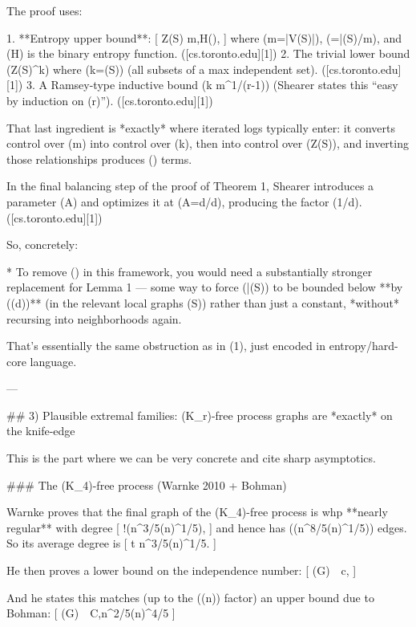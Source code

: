 The proof uses:

1. **Entropy upper bound**:
   [
   \log Z(S) \le m,H(\phi),
   ]
   where (m=|V(S)|), (\phi=\bar\alpha(S)/m), and (H) is the binary entropy function. ([cs.toronto.edu][1])
2. The trivial lower bound (Z(S)^{k}) where (k=\alpha(S)) (all subsets of a max independent set). ([cs.toronto.edu][1])
3. A Ramsey-type inductive bound (k \ge m^{1/(r-1)}) (Shearer states this “easy by induction on (r)”). ([cs.toronto.edu][1])

That last ingredient is *exactly* where iterated logs typically enter: it converts control over (m) into control over (k), then into control over (\log Z(S)), and inverting those relationships produces (\log\log) terms.

In the final balancing step of the proof of Theorem 1, Shearer introduces a parameter (A) and optimizes it at (A=d/\log d), producing the factor (1/\log\log d). ([cs.toronto.edu][1])

So, concretely:

* To remove (\log\log) in this framework, you would need a substantially stronger replacement for Lemma 1 — some way to force (\bar\alpha(S)) to be bounded below **by (\Theta(\log d))** (in the relevant local graphs (S)) rather than just a constant, *without* recursing into neighborhoods again.

That’s essentially the same obstruction as in (1), just encoded in entropy/hard-core language.

---

## 3) Plausible extremal families: (K_r)-free process graphs are *exactly* on the knife-edge

This is the part where we can be very concrete and cite sharp asymptotics.

### The (K_4)-free process (Warnke 2010 + Bohman)

Warnke proves that the final graph of the (K_4)-free process is whp **nearly regular** with degree
[
\Theta!\left(n^{3/5}(\log n)^{1/5}\right),
]
and hence has (\Theta(n^{8/5}(\log n)^{1/5})) edges. 
So its average degree is
[
t \asymp n^{3/5}(\log n)^{1/5}.
]

He then proves a lower bound on the independence number:
[
\alpha(G)\ \ge\ c,
\quad{}
]

And he states this matches (up to the (\Theta(\log\log n)) factor) an upper bound due to Bohman:
[
\alpha(G)\ \le\ C,n^{2/5}(\log n)^{4/5}
\quad{}
]


